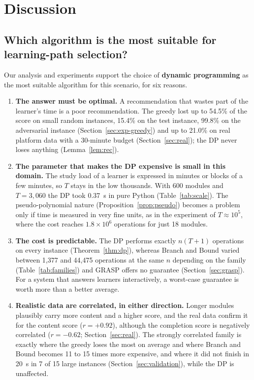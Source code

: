 \section{Discussion}\label{sec:discussion}

\subsection{Which algorithm is the most suitable for learning-path selection?}

Our analysis and experiments support the choice of \textbf{dynamic programming} as the most suitable algorithm for this scenario, for six reasons.

\begin{enumerate}[leftmargin=1.6em,itemsep=3pt]
\item \textbf{The answer must be optimal.} A recommendation that wastes part of the learner's time is a poor recommendation. The greedy lost up to 54.5\% of the score on small random instances, 15.4\% on the test instance, 99.8\% on the adversarial instance (Section~\ref{sec:exp-greedy}) and up to 21.0\% on real platform data with a 30-minute budget (Section~\ref{sec:real}); the DP never loses anything (Lemma~\ref{lem:rec}).
\item \textbf{The parameter that makes the DP expensive is small in this domain.} The study load of a learner is expressed in minutes or blocks of a few minutes, so $T$ stays in the low thousands. With 600 modules and $T=3{,}060$ the DP took 0.37~s in pure Python (Table~\ref{tab:scale}). The pseudo-polynomial nature (Proposition~\ref{prop:pseudo}) becomes a problem only if time is measured in very fine units, as in the experiment of $T\approx10^5$, where the cost reaches $1.8\times10^6$ operations for just 18 modules.
\item \textbf{The cost is predictable.} The DP performs exactly $n(T+1)$ operations on every instance (Theorem~\ref{thm:dp}), whereas Branch and Bound varied between 1,377 and 44,475 operations at the same $n$ depending on the family (Table~\ref{tab:families}) and GRASP offers no guarantee (Section~\ref{sec:grasp}). For a system that answers learners interactively, a worst-case guarantee is worth more than a better average.
\item \textbf{Realistic data are correlated, in either direction.} Longer modules plausibly carry more content and a higher score, and the real data confirm it for the content score ($r=+0.92$), although the completion score is negatively correlated ($r=-0.62$; Section~\ref{sec:real}). The strongly correlated family is exactly where the greedy loses the most on average and where Branch and Bound becomes 11 to 15 times more expensive, and where it did not finish in 20~s in 7 of 15 large instances (Section~\ref{sec:validation}), while the DP is unaffected.

\end{enumerate}
